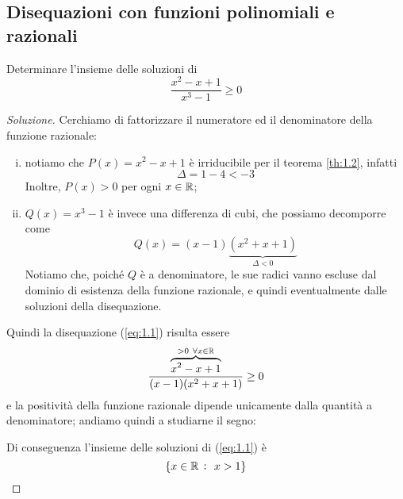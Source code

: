 \subsection{Disequazioni con funzioni polinomiali e razionali}
\begin{exercise}
    \label{ex:1.1}
    Determinare l'insieme delle soluzioni di 
    \begin{equation}
        \label{eq:1.1}
        \frac{x^2-x+1}{x^3-1}\ge 0
    \end{equation}
\end{exercise}
\begin{proof}[Soluzione]
    Cerchiamo di fattorizzare il numeratore ed il denominatore della funzione razionale:
    \begin{enumerate}[(i)]
        \item notiamo che $P(x) = x^2-x+1$ è irriducibile per il teorema \ref{th:1.2}, infatti
        \[
        \Delta = 1-4 <-3
        \]
        Inoltre, $P(x)>0$ per ogni $x\in\amsbb{R}$;
        \item $Q(x)=x^3-1$ è invece una differenza di cubi, che possiamo decomporre come
        \[
        Q(x) = (x-1)\underbrace{(x^2+x+1)}_{\Delta<0}
        \]
        Notiamo che, poiché $Q$ è a denominatore, le sue radici vanno escluse dal dominio di esistenza della funzione razionale, e quindi eventualmente dalle soluzioni della disequazione.
    \end{enumerate}
    Quindi la disequazione (\ref{eq:1.1}) risulta essere
    \[
    \frac{\overbrace{x^2-x+1}^{>0 \ \forall x\in\amsbb{R}}}{(x-1)(x^2+x+1)}\ge 0
    \]
    e la positività della funzione razionale dipende unicamente dalla quantità a denominatore; andiamo quindi a studiarne il segno:\\
    
    \begin{center}
    \end{center}
    Di conseguenza l'insieme delle soluzioni di (\ref{eq:1.1}) è 
    \[
    \left\{x\in\amsbb{R} \ \colon \ x>1\right\}
    \]
\end{proof}
\newpage